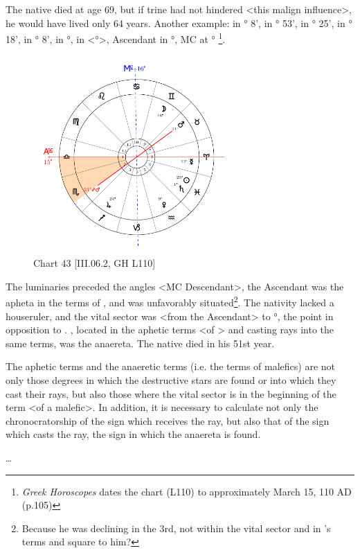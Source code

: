 The native died at age 69, but if \Jupiter\xspace trine had not hindered <this malign influence>, he would have lived only 64 years.
\newpage
Another example: \Sun\xspace in \Pisces\xspace 25° 8', \Moon\xspace in \Gemini\xspace 16° 53', \Saturn\xspace in \Pisces\xspace 1° 25', \Jupiter\xspace in
\Sagittarius\xspace 24° 18', \Mars\xspace in \Taurus\xspace 21° 8', \Venus\xspace in \Aquarius\xspace 9°, \Mercury\xspace in <°>, Ascendant in \Libra\xspace 15°, MC at \Cancer\xspace 16°
\footnote{\textit{Greek Horoscopes} dates the chart (L110) to approximately March 15, 110 AD (p.105)}.  

\clearpage
\begin{figure}
\centering
\vspace{-20pt}
\includegraphics[width=0.68\textwidth]{charts/3_06_2}
\caption{Chart 43 [III.06.2, GH L110]}
\label{fig:chart43}
\end{figure} 

The luminaries preceded the angles <MC Descendant>, the Ascendant was the apheta in the terms of \Jupiter, and \Jupiter\xspace was unfavorably situated\footnote{Because he was declining in the 3rd, not within the vital sector and in \Saturn's terms and square to him?}. The nativity lacked a houseruler, and the vital sector was <from the Ascendant> to \Scorpio\xspace 21°, the point in opposition to \Mars. \Mars, located in the aphetic terms <of \Jupiter> and casting rays into the same terms, was the anaereta. The
native died in his 51st year.

The aphetic terms and the anaeretic terms (i.e. the terms of malefics) are not only those degrees in which the destructive stars are found or into which they cast their rays, but also those where the vital sector
is in the beginning of the term <of a malefic>. In addition, it is necessary to calculate not only the chronocratorship of the sign which receives the ray, but also that of the sign which casts the ray, the sign in which the anaereta is found.

\ldots
\newpage